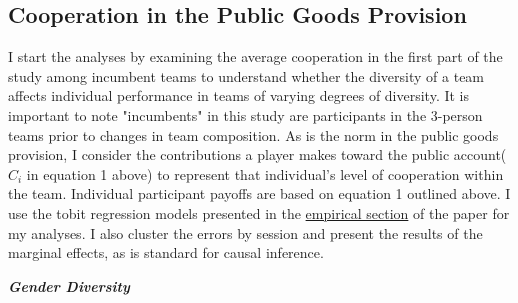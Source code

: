 \subsection{Cooperation in the Public Goods Provision}
\noindent I start the analyses by examining the average cooperation in the first part of the study among incumbent teams to understand whether the diversity of a team affects individual performance in teams of varying degrees of diversity. It is important to note "incumbents" in this study are participants in the 3-person teams prior to changes in team composition. As is the norm in the public goods provision, I consider the contributions a player makes toward the public account($C_i$ in equation 1 above) to represent that individual's level of cooperation within the team. Individual participant payoffs are based on equation 1 outlined above. I use the tobit regression models presented in the \hyperref[subsec:Specification]{empirical section} of the paper for my analyses. I also cluster the errors by session and present the results of the marginal effects, as is standard for causal inference.  

\noindent\textbf{\textit{Gender Diversity}} 

